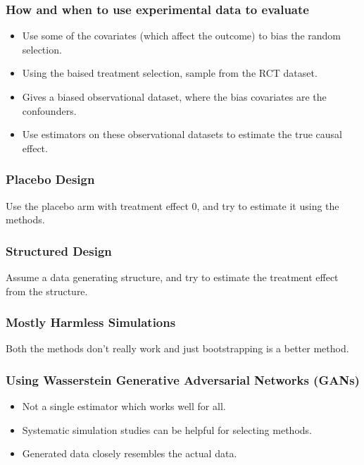 \documentclass{beamer}
\begin{document}
\begin{frame}
	\frametitle{How and when to use experimental data to evaluate}
	\begin{itemize}
		\item Use some of the covariates (which affect the outcome) to bias the random
			selection.
		\item Using the baised treatment selection, sample from the RCT dataset.
		\item Gives a biased observational dataset, where the bias covariates are the 
			confounders.
		\item Use estimators on these observational datasets to estimate the true 
			causal effect.
	\end{itemize}
\end{frame}

\begin{frame}
	\frametitle{Placebo Design}
	Use the placebo arm with treatment effect 0, and try to estimate it using the methods.
\end{frame}

\begin{frame}
	\frametitle{Structured Design}
	Assume a data generating structure, and try to estimate the treatment effect from the structure.
\end{frame}

\begin{frame}
	\frametitle{Mostly Harmless Simulations}
	Both the methods don't really work and just bootstrapping is a better method.
\end{frame}

\begin{frame}
	\frametitle{Using Wasserstein Generative Adversarial Networks (GANs)}
	\begin{itemize}
		\item Not a single estimator which works well for all.
		\item Systematic simulation studies can be helpful for selecting methods.
		\item Generated data closely resembles the actual data.
	\end{itemize}
\end{frame}
\end{document}
